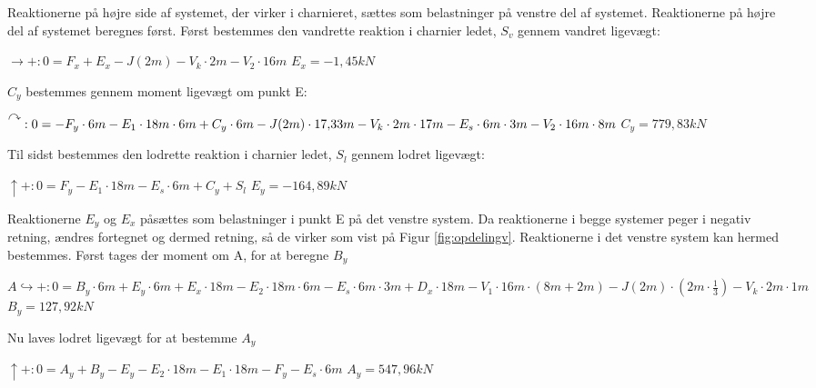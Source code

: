 Reaktionerne på højre side af systemet, der virker i charnieret, sættes som belastninger på venstre del af systemet. Reaktionerne på højre del af systemet beregnes først.
\newline
\newline
Først bestemmes den vandrette reaktion i charnier ledet, $S_v$ gennem vandret ligevægt: 
\begin{center}
	$\rightarrow+:0 = F_x + E_x - J(2m) - V_k \cdot 2m - V_2 \cdot 16m$
	\newline
	$E_x = -1,\!45 kN$
\end{center}

$C_y$ bestemmes gennem moment ligevægt om punkt E: 
\begin{center}
	$\AR{}:0 = -F_y \cdot 6m - E_1 \cdot 18m \cdot 6m + C_y \cdot 6m - J(2m) \cdot 17,\!33m - V_k \cdot 2m \cdot 17m - E_s \cdot 6m \cdot 3m - V_2 \cdot 16m \cdot 8m$
	\newline
	$C_y = 779,\!83 kN$
\end{center}

Til sidst bestemmes den lodrette reaktion i charnier ledet, $S_l$ gennem lodret ligevægt: 
\begin{center}
	$\uparrow+: 0 = F_y - E_1 \cdot 18m - E_s \cdot 6m + C_y + S_l$
	\newline	
	$E_y = -164,\!89 kN$
\end{center}

Reaktionerne $E_y$ og $E_x$ påsættes som belastninger i punkt E på det venstre system. Da reaktionerne i begge systemer peger i negativ retning, ændres fortegnet og dermed retning, så de virker som vist på Figur \ref{fig:opdelingv}.
\newline \indent{     } Reaktionerne i det venstre system kan hermed bestemmes.
\newline
\newline
Først tages der moment om A, for at beregne $B_y$  
\begin{center}
	$A\hookrightarrow+: 0 = B_y \cdot 6m + E_y \cdot 6m + E_x \cdot 18m - E_2 \cdot 18m \cdot 6m - E_s \cdot 6m \cdot 3m + D_x \cdot 18m - V_1 \cdot 16m \cdot (8m + 2m) - J(2m) \cdot (2m \cdot \frac{1}{3}) - V_k \cdot 2m \cdot 1m$
	\newline 
	$B_y = 127,\!92 kN$
\end{center}

Nu laves lodret ligevægt for at bestemme $A_y$
\begin{center}
	$\uparrow+: 0 = A_y + B_y - E_y - E_2 \cdot 18m - E_1 \cdot 18m - F_y - E_s \cdot 6 m$
	\newline
	$A_y = 547,\!96 kN$
\end{center}

